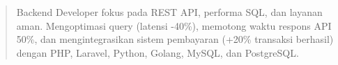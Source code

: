 \begin{quote}
Backend Developer fokus pada REST API, performa SQL, dan layanan aman. Mengoptimasi query (latensi -40\%), memotong waktu respons API 50\%, dan mengintegrasikan sistem pembayaran (+20\% transaksi berhasil) dengan PHP, Laravel, Python, Golang, MySQL, dan PostgreSQL.
\end{quote}
\divider
{}
\divider
{}
\divider
{}

\par{}
   \\
   
\divider\smallskip
{}  \\
  
\par
